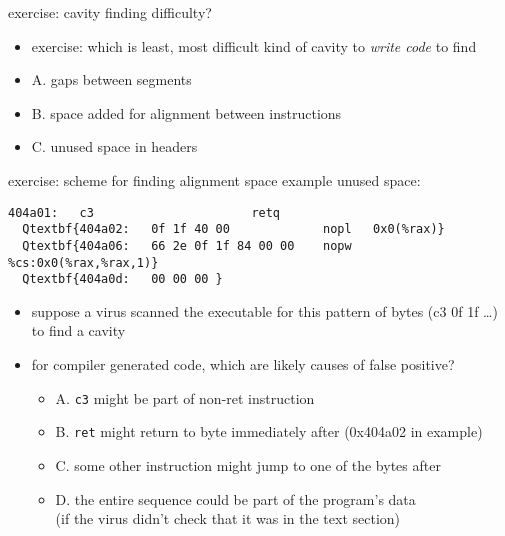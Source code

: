 \begin{frame}{exercise: cavity finding difficulty?}
    \begin{itemize}
    \item exercise: which is least, most difficult kind of cavity
           to \textit{write code} to find
    \vspace{.5cm}
    \item A. gaps between segments
    \item B. space added for alignment between instructions
    \item C. unused space in headers
    \end{itemize}
\end{frame}

\begin{frame}[fragile,label=alignSpace]{exercise: scheme for finding alignment space}
example unused space:
\begin{Verbatim}[fontsize=\fontsize{9}{10}\selectfont,commandchars=Q\{\}]
  404a01:	c3                   	retq   
  Qtextbf{404a02:	0f 1f 40 00          	nopl   0x0(%rax)}
  Qtextbf{404a06:	66 2e 0f 1f 84 00 00 	nopw   %cs:0x0(%rax,%rax,1)}
  Qtextbf{404a0d:	00 00 00 }
\end{Verbatim}
\begin{itemize}
\item suppose a virus scanned the executable for this pattern of bytes (c3 0f 1f \ldots) \\ to find a cavity
\item for compiler generated code, which are likely causes of false positive?
    \begin{itemize}
    \item A. \texttt{c3} might be part of non-ret instruction
    \item B. \texttt{ret} might return to byte immediately after (0x404a02 in example)
    \item C. some other instruction might jump to one of the bytes after
    \item D. the entire sequence could be part of the program's data \\
             (if the virus didn't check that it was in the text section)
    \end{itemize}
\end{itemize}
\end{frame}
